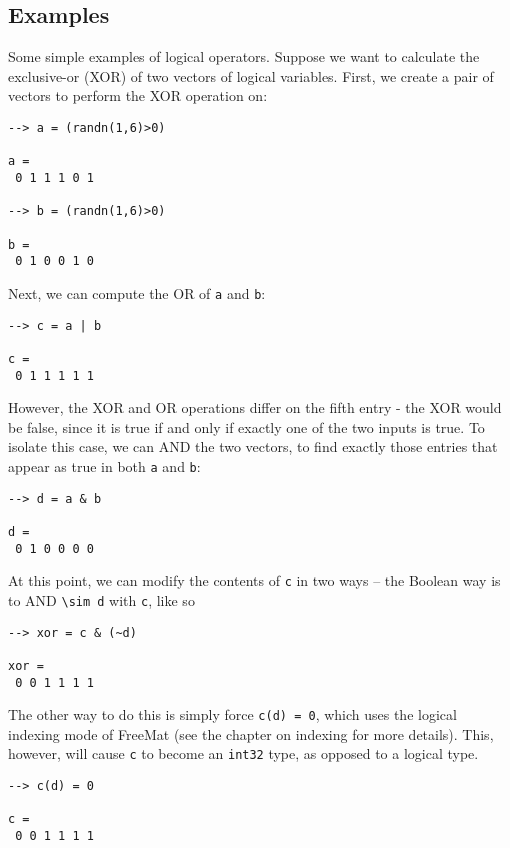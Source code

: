 \subsection{Examples}

Some simple examples of logical operators.  Suppose we want to calculate the exclusive-or (XOR) of two vectors of logical variables.  First, we create a pair of vectors to perform the XOR operation on:
\begin{verbatim}
--> a = (randn(1,6)>0)

a = 
 0 1 1 1 0 1 

--> b = (randn(1,6)>0)

b = 
 0 1 0 0 1 0 
\end{verbatim}
Next, we can compute the OR of \verb|a| and \verb|b|:
\begin{verbatim}
--> c = a | b

c = 
 0 1 1 1 1 1 
\end{verbatim}
However, the XOR and OR operations differ on the fifth entry - the XOR would be false, since it is true if and only if exactly one of the two inputs is true.  To isolate this case, we can AND the two vectors, to find exactly those entries that appear as true in both \verb|a| and \verb|b|:
\begin{verbatim}
--> d = a & b

d = 
 0 1 0 0 0 0 
\end{verbatim}
At this point, we can modify the contents of \verb|c| in two ways -- the Boolean way is to AND \verb|\sim d| with \verb|c|, like so
\begin{verbatim}
--> xor = c & (~d)

xor = 
 0 0 1 1 1 1 
\end{verbatim}
The other way to do this is simply force \verb|c(d) = 0|, which uses the logical indexing mode of FreeMat (see the chapter on indexing for more details).  This, however, will cause \verb|c| to become an \verb|int32| type, as opposed to a logical type.
\begin{verbatim}
--> c(d) = 0

c = 
 0 0 1 1 1 1 
\end{verbatim}

